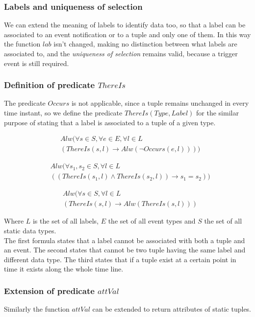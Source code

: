 \subsubsection{Labels and uniqueness of selection}
We can extend the meaning of labels to identify data too, so that a label can be associated to an event notification or to a tuple and only one of them. In this way the function $lab$ isn't changed, making no distinction between what labels are associated to, and the \emph{uniqueness of selection} remains valid, because a trigger event is still required.

\subsubsection{Definition of predicate $ThereIs$}
The predicate $Occurs$ is not applicable, since a tuple remains unchanged in every time instant, so we define the predicate $ThereIs(Type, Label)$ for the similar purpose of stating that a label is associated to a tuple of a given type.

\begin{align*}
  &Alw(\forall s \in S, \forall e \in E, \forall l \in L\\
  &(ThereIs(s, l) \rightarrow Alw(\neg Occurs(e, l))))
\end{align*}

\begin{align*}
  &Alw(\forall s_1,s_2 \in S, \forall l \in L\\
  &((ThereIs(s_1, l) \wedge ThereIs(s_2, l)) \rightarrow s_1=s_2))
\end{align*}

\begin{align*}
  &Alw(\forall s \in S, \forall l \in L\\
  &(ThereIs(s, l) \rightarrow Alw(ThereIs(s, l)))
\end{align*}

Where $L$ is the set of all labels, $E$ the set of all event types and $S$ the set of all static data types.\\
The first formula states that a label cannot be associated with both a tuple and an event. The second states that cannot be two tuple having the same label and different data type. The third states that if a tuple exist at a certain point in time it exists along the whole time line.

\subsubsection{Extension of predicate $attVal$}
Similarly the function $attVal$ can be extended to return attributes of static tuples.

